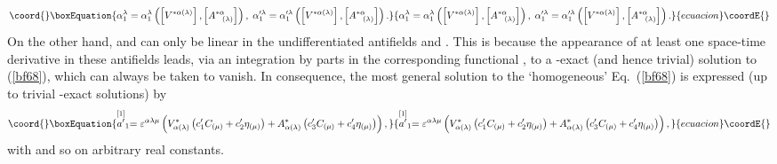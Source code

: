 \documentclass[a4paper,11pt]{article}
\begin{document}
\begin{equation}\coord{}\boxEquation{
\alpha _{1}^{\lambda }=\alpha _{1}^{\lambda }\left( \left[ V^{*\alpha
(\lambda )}\right] ,\left[ A_{\;\;\;(\lambda )}^{*\alpha }\right] \right)
,\;\alpha _{1}^{\prime \lambda }=\alpha _{1}^{\prime \lambda }\left( \left[
V^{*\alpha (\lambda )}\right] ,\left[ A_{\;\;\;(\lambda )}^{*\alpha }\right]
\right) .  \label{bf70}
}{
\alpha _{1}^{\lambda }=\alpha _{1}^{\lambda }\left( \left[ V^{*\alpha
(\lambda )}\right] ,\left[ A_{\;\;\;(\lambda )}^{*\alpha }\right] \right)
,\;\alpha _{1}^{\prime \lambda }=\alpha _{1}^{\prime \lambda }\left( \left[
V^{*\alpha (\lambda )}\right] ,\left[ A_{\;\;\;(\lambda )}^{*\alpha }\right]
\right) .  }{ecuacion}\coordE{}\end{equation}
On the other hand, \coordHE{} and \coordHE{} can only be linear in the undifferentiated antifields \coordHE{} and \coordHE{}. This is because the
appearance of at least one space-time derivative in these antifields leads,
via an integration by parts in the corresponding functional \coordHE{}, to a \myHighlight{$\gamma $}\coordHE{}%
-exact (and hence trivial) solution to (\ref{bf68}), which can always be
taken to vanish. In consequence, the most general solution to the
`homogeneous' Eq.~(\ref{bf68}) is expressed (up to trivial \myHighlight{$\gamma $}\coordHE{}-exact
solutions) by
\begin{equation}\coord{}\boxEquation{
\stackrel{\lbrack 1]}{a^{\prime }}_{1}=\varepsilon ^{\alpha \lambda \mu
}\left( V_{\alpha (\lambda )}^{*}\left( c_{1}^{\prime }C_{(\mu
)}+c_{2}^{\prime }\eta _{(\mu )}\right) +A_{\alpha (\lambda )}^{*}\left(
c_{3}^{\prime }C_{(\mu )}+c_{4}^{\prime }\eta _{(\mu )}\right) \right) ,
\label{bf71}
}{
\stackrel{\lbrack 1]}{a^{\prime }}_{1}=\varepsilon ^{\alpha \lambda \mu
}\left( V_{\alpha (\lambda )}^{*}\left( c_{1}^{\prime }C_{(\mu
)}+c_{2}^{\prime }\eta _{(\mu )}\right) +A_{\alpha (\lambda )}^{*}\left(
c_{3}^{\prime }C_{(\mu )}+c_{4}^{\prime }\eta _{(\mu )}\right) \right) ,
}{ecuacion}\coordE{}\end{equation}
with \coordHE{} and so on arbitrary real constants.
\end{document}
